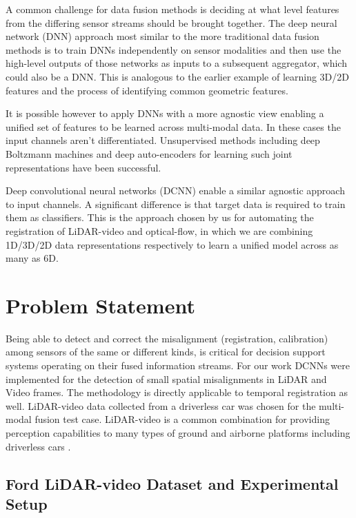 \documentclass{article}
\begin{document}
A common challenge for data fusion methods is deciding at what level features from the differing sensor streams should be brought together. The deep neural network (DNN) approach most similar to the more traditional data fusion methods is to train DNNs independently on sensor modalities and then use the high-level outputs of those networks as inputs to a subsequent aggregator, which could also be a DNN. This is analogous to the earlier example of learning 3D/2D features and the process of identifying common geometric features. 

It is possible however to apply DNNs with a more agnostic view enabling a unified set of features to be learned across multi-modal data. In these cases the input channels aren't differentiated. Unsupervised methods including deep Boltzmann machines and deep auto-encoders for learning such joint representations have been successful.  

Deep convolutional neural networks (DCNN) enable a similar agnostic approach to input channels. A significant difference is that target data is required to train them as classifiers. This is the approach chosen by us for automating the registration of LiDAR-video and optical-flow, in which we are combining 1D/3D/2D data representations respectively to learn a unified model across as many as 6D. 




\section{Problem Statement} %
\label{sec:problem_statement}

Being able to detect and correct the misalignment (registration, calibration) among sensors of the same or different kinds, is critical for decision support systems operating on their fused information streams. For our work DCNNs were implemented for the detection of small spatial misalignments in LiDAR and Video frames. The methodology is directly applicable to temporal registration as well. LiDAR-video data collected from a driverless car was chosen for the multi-modal fusion test case. LiDAR-video is a common combination for providing perception capabilities to many types of ground and airborne platforms including driverless cars \cite{Thrun2011Googles-dr}. 

\subsection{Ford LiDAR-video Dataset and Experimental Setup} %
\label{sub:ford_lidar_video_dataset_and_experimental_setup}
\end{document}
